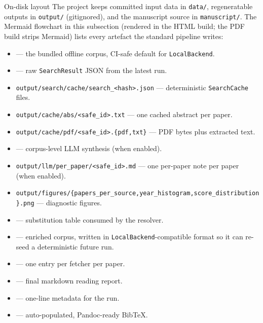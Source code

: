 \documentclass[
  ignorenonframetext,
]{beamer}
\providecommand{\tightlist}{%
  \setlength{\itemsep}{0pt}\setlength{\parskip}{0pt}}
\begin{document}
\begin{frame}{On-disk layout}
\protect{}\label{on-disk-layout}
The project keeps committed input data in \texttt{data/}, regeneratable
outputs in \texttt{output/} (gitignored), and the manuscript source in
\texttt{manuscript/}. The Mermaid flowchart in this subsection (rendered
in the HTML build; the PDF build strips Mermaid) lists every artefact
the standard pipeline writes:

\begin{itemize}
\tightlist
\item
   --- the bundled offline corpus, CI-safe
  default for \texttt{LocalBackend}.
\item
   --- raw \texttt{SearchResult} JSON
  from the latest run.
\item
  \texttt{output/search/cache/search\_\textless{}hash\textgreater{}.json}
  --- deterministic \texttt{SearchCache} files.
\item
  \texttt{output/cache/abs/\textless{}safe\_id\textgreater{}.txt} ---
  one cached abstract per paper.
\item
  \texttt{output/cache/pdf/\textless{}safe\_id\textgreater{}.\{pdf,txt\}}
  --- PDF bytes plus extracted text.
\item
   --- corpus-level LLM synthesis (when
  enabled).
\item
  \texttt{output/llm/per\_paper/\textless{}safe\_id\textgreater{}.md}
  --- one per-paper note per paper (when enabled).
\item
  \texttt{output/figures/\{papers\_per\_source,year\_histogram,score\_distribution\}.png}
  --- diagnostic figures.
\item
   --- substitution table
  consumed by the resolver.
\item
   --- enriched corpus, written in
  \texttt{LocalBackend}-compatible format so it can re-seed a
  deterministic future run.
\item
   --- one entry per fetcher per
  paper.
\item
   --- final markdown reading report.
\item
   --- one-line metadata for the run.
\item
   --- auto-populated, Pandoc-ready
  BibTeX.
\end{itemize}


\end{frame}
\end{document}
